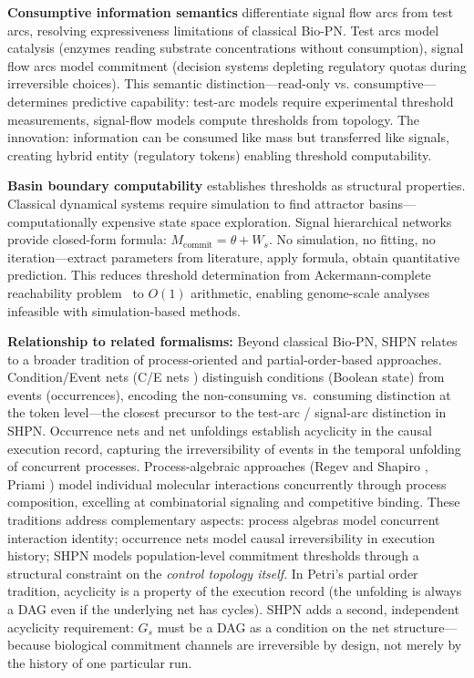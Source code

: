 \documentclass[10pt,letterpaper]{article}
\begin{document}
\textbf{Consumptive information semantics} differentiate signal flow arcs from test arcs, resolving expressiveness limitations of classical Bio-PN. Test arcs model catalysis (enzymes reading substrate concentrations without consumption), signal flow arcs model commitment (decision systems depleting regulatory quotas during irreversible choices). This semantic distinction---read-only vs. consumptive---determines predictive capability: test-arc models require experimental threshold measurements, signal-flow models compute thresholds from topology. The innovation: information can be consumed like mass but transferred like signals, creating hybrid entity (regulatory tokens) enabling threshold computability.

\textbf{Basin boundary computability} establishes thresholds as structural properties. Classical dynamical systems require simulation to find attractor basins---computationally expensive state space exploration. Signal hierarchical networks provide closed-form formula: $M_{\text{commit}} = \theta + W_s$. No simulation, no fitting, no iteration---extract parameters from literature, apply formula, obtain quantitative prediction. This reduces threshold determination from Ackermann-complete reachability problem~\cite{czerwinski2021} to $O(1)$ arithmetic, enabling genome-scale analyses infeasible with simulation-based methods.

\textbf{Relationship to related formalisms:} Beyond classical Bio-PN, SHPN relates to a broader tradition of process-oriented and partial-order-based approaches. Condition/Event nets (C/E nets \cite{rozenberg1998}) distinguish conditions (Boolean state) from events (occurrences), encoding the non-consuming vs.~consuming distinction at the token level---the closest precursor to the test-arc / signal-arc distinction in SHPN. Occurrence nets and net unfoldings \cite{nielsen1981,winskel1987} establish acyclicity in the causal execution record, capturing the irreversibility of events in the temporal unfolding of concurrent processes. Process-algebraic approaches (Regev and Shapiro \cite{regev2002}, Priami \cite{priami2005}) model individual molecular interactions concurrently through process composition, excelling at combinatorial signaling and competitive binding. These traditions address complementary aspects: process algebras model concurrent interaction identity; occurrence nets model causal irreversibility in execution history; SHPN models population-level commitment thresholds through a structural constraint on the \textit{control topology itself}. In Petri's partial order tradition, acyclicity is a property of the execution record (the unfolding is always a DAG even if the underlying net has cycles). SHPN adds a second, independent acyclicity requirement: $G_s$ must be a DAG as a condition on the net structure---because biological commitment channels are irreversible by design, not merely by the history of one particular run.
\end{document}
